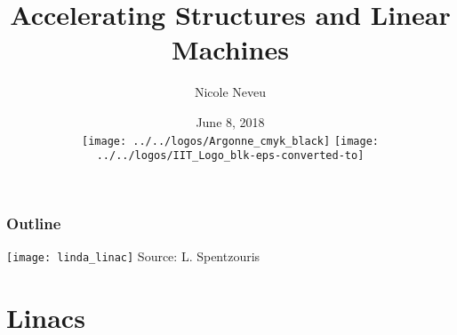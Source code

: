 \documentclass[professionalfonts,t]{beamer}
\title[USPAS Fundamentals, June 4-15, 2018]{Accelerating Structures and Linear Machines}
\author[N.Neveu]{{\Large Nicole Neveu}}
\institute[ANL, IIT] %
{   Illinois Institute of Technology \\
	Argonne National Laboratory \\
    \url{nneveu@anl.gov} 
}
\date{ June 8, 2018 \\ \vspace{0.5em}
\texttt{[image: ../../logos/Argonne\_cmyk\_black]}%
\hfill \hfill \hfill%
\texttt{[image: ../../logos/IIT\_Logo\_blk-eps-converted-to]}%
}
\begin{document}
\begin{frame}
  \titlepage
\end{frame}
\begin{frame}
	\frametitle{Outline}
	\begin{minipage}{0.4\textwidth}
		\tableofcontents
	\end{minipage}\hfill
\begin{minipage}{0.5\textwidth}
	\centering
	\texttt{[image: linda\_linac]}
	Source: L. Spentzouris
\end{minipage}
\end{frame}







\section{Linacs}
\end{document}
